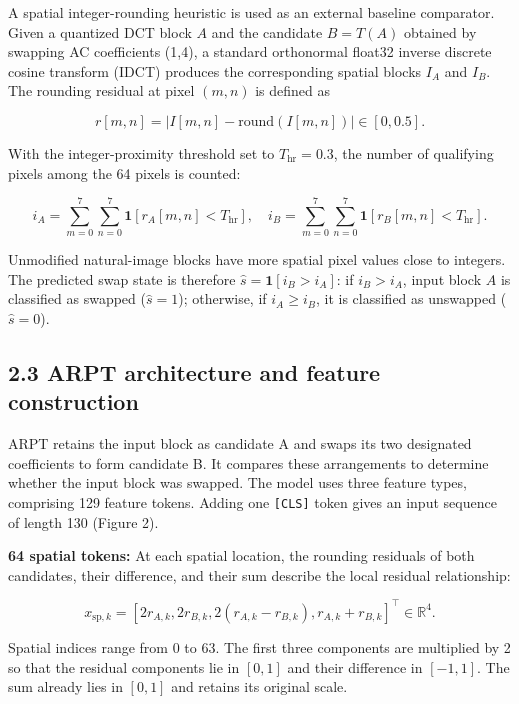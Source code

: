 \documentclass[
  11pt,
  a4paper,
]{article}
\begin{document}
A spatial integer-rounding heuristic is used as an external baseline
comparator. Given a quantized DCT block \(A\) and the candidate
\(B = T(A)\) obtained by swapping AC coefficients (1,4), a standard
orthonormal float32 inverse discrete cosine transform (IDCT) produces
the corresponding spatial blocks \(I_A\) and \(I_B\). The rounding
residual at pixel \((m,n)\) is defined as

\[
r[m,n] = |I[m,n] - \mathrm{round}(I[m,n])| \in [0, 0.5]. \tag{4}
\]

With the integer-proximity threshold set to \(T_{\mathrm{hr}} = 0.3\),
the number of qualifying pixels among the 64 pixels is counted:

\[
i_A = \sum_{m=0}^7 \sum_{n=0}^7 \mathbf{1}[r_A[m,n] < T_{\mathrm{hr}}], \quad i_B = \sum_{m=0}^7 \sum_{n=0}^7 \mathbf{1}[r_B[m,n] < T_{\mathrm{hr}}]. \tag{5}
\]

Unmodified natural-image blocks have more spatial pixel values close to
integers. The predicted swap state is therefore
\(\hat{s} = \mathbf{1}[i_B > i_A]\): if \(i_B > i_A\), input block \(A\)
is classified as swapped (\(\hat{s}=1\)); otherwise, if \(i_A \ge i_B\),
it is classified as unswapped (\(\hat{s}=0\)).

\subsection*{2.3 ARPT architecture and feature
construction}\label{arpt-architecture-and-feature-construction}

ARPT retains the input block as candidate A and swaps its two designated
coefficients to form candidate B. It compares these arrangements to
determine whether the input block was swapped. The model uses three
feature types, comprising 129 feature tokens. Adding one
\texttt{{[}CLS{]}} token gives an input sequence of length 130 (Figure
2).

\textbf{64 spatial tokens:} At each spatial location, the rounding
residuals of both candidates, their difference, and their sum describe
the local residual relationship:

\[
x_{\mathrm{sp},k} = [2r_{A,k}, 2r_{B,k}, 2(r_{A,k}-r_{B,k}), r_{A,k}+r_{B,k}]^\top \in \mathbb{R}^4. \tag{6}
\]

Spatial indices range from 0 to 63. The first three components are
multiplied by 2 so that the residual components lie in \([0,1]\) and
their difference in \([-1,1]\). The sum already lies in \([0,1]\) and
retains its original scale.
\end{document}
